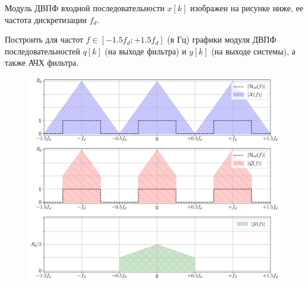 Модуль ДВПФ входной последовательности $x[k]$ изображен на рисунке ниже, ее частота дискретизации $f_d$.

Построить для частот $f \in [-1.5f_d; +1.5f_d]$ (в Гц) графики модуля ДВПФ последовательностей
$q[k]$ (на выходе фильтра) и $y[k]$ (на выходе системы), а также АЧХ фильтра.

\begin{figure}[!h]
	\centering
	\includegraphics[width=1.0\columnwidth]{pics/spring/8/8-3.png}
	\label{fig:8-3}
\end{figure}

